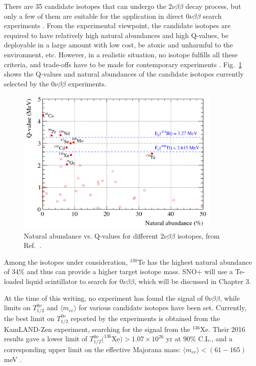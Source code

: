 There are 35 candidate isotopes that can undergo the $2\nu\beta\beta$ decay process, but only a few of them are suitable for the application in direct $0\nu\beta\beta$ search experiments \cite{giunti2007fundamentals}. From the experimental viewpoint, the candidate isotopes are required to have relatively high natural abundances and high Q-values, be deployable in a large amount with low cost, be atoxic and unharmful to the environment, etc. However, in a realistic situation, no isotope fulfills all these criteria, and trade-offs have to be made for contemporary experiments \cite{dolinski2019neutrinoless}. Fig.~\ref{fig:te_abundance} shows the Q-values and natural abundances of the candidate isotopes currently selected by the $0\nu\beta\beta$ experiments.

\begin{figure}[!htb]
	\centering
	\includegraphics[width=10cm]{Te_abundance.png}
	\caption[Natural abundance vs. Q-values for different $2\nu\beta\beta$ isotopes.]{Natural abundance vs. Q-values for different $2\nu\beta\beta$ isotopes, from Ref.~\cite{snop_jinst}.\label{fig:te_abundance}}
\end{figure}

Among the isotopes under consideration, $^{130}$Te has the highest natural abundance of 34\% and thus can provide a higher target isotope mass. SNO+ will use a Te-loaded liquid scintillator to search for $0\nu\beta\beta$, which will be discussed in Chapter 3. 

At the time of this writing, no experiment has found the signal of $0\nu\beta\beta$, while limits on $T^{0\nu}_{1/2}$ and $\langle m_{ee}\rangle$ for various candidate isotopes have been set. Currently, the best limit on $T^{0\nu}_{1/2}$ reported by the experiments is obtained from the KamLAND-Zen experiment, searching for the signal from the $^{136}$Xe. Their 2016 results gave a lower limit of $T^{0\nu}_{1/2}(^{136}$Xe$)>1.07\times 10^{26}$ yr at 90\% C.L., and a corresponding upper limit on the effective Majorana mass: $\langle m_{ee}\rangle<(61-165)$ meV \cite{gando2016search}. 

